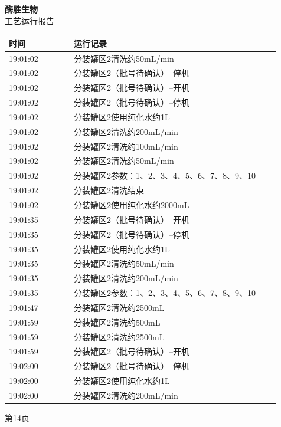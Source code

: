 \documentclass[UTF8,10pt,a4paper,fontset=fandol]{ctexart}
\begin{document}
\hfill
\begin{minipage}[t]{0.48\linewidth}
\centering
\textbf{酶胜生物}\\[2pt]
工艺运行报告

\smallskip
\begin{tabular}{|p{0.22\linewidth}|p{0.70\linewidth}|}
\hline
时间 & 运行记录\\ \hline
19:01:02 & 分装罐区2清洗约50mL/min\\ \hline
19:01:02 & 分装罐区2（批号待确认）--停机\\ \hline
19:01:02 & 分装罐区2（批号待确认）--开机\\ \hline
19:01:02 & 分装罐区2（批号待确认）--停机\\ \hline
19:01:02 & 分装罐区2使用纯化水约1L\\ \hline
19:01:02 & 分装罐区2清洗约200mL/min\\ \hline
19:01:02 & 分装罐区2清洗约100mL/min\\ \hline
19:01:02 & 分装罐区2清洗约50mL/min\\ \hline
19:01:02 & 分装罐区2参数：1、2、3、4、5、6、7、8、9、10\\ \hline
19:01:02 & 分装罐区2清洗结束\\ \hline
19:01:02 & 分装罐区2使用纯化水约2000mL\\ \hline
19:01:35 & 分装罐区2（批号待确认）--开机\\ \hline
19:01:35 & 分装罐区2（批号待确认）--停机\\ \hline
19:01:35 & 分装罐区2使用纯化水约1L\\ \hline
19:01:35 & 分装罐区2清洗约50mL/min\\ \hline
19:01:35 & 分装罐区2清洗约200mL/min\\ \hline
19:01:35 & 分装罐区2参数：1、2、3、4、5、6、7、8、9、10\\ \hline
19:01:47 & 分装罐区2清洗约2500mL\\ \hline
19:01:59 & 分装罐区2清洗约500mL\\ \hline
19:01:59 & 分装罐区2清洗约2500mL\\ \hline
19:01:59 & 分装罐区2（批号待确认）--开机\\ \hline
19:02:00 & 分装罐区2（批号待确认）--停机\\ \hline
19:02:00 & 分装罐区2使用纯化水约1L\\ \hline
19:02:00 & 分装罐区2清洗约200mL/min\\ \hline
\end{tabular}

\vspace{2pt}
第14页
\end{minipage}
\end{document}
